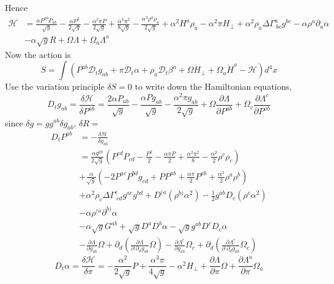 \documentclass{article}
\begin{document}
Hence
\begin{align*}
\mathscr{H} & = \frac{\alpha P^{ab}P_{ab}}{\sqrt{g}} - \frac{\alpha P^{2}}{2\sqrt{g}} - \frac{\alpha^{2}\pi P}{2\sqrt{g}} + \frac{\alpha^{3}\pi^{2}}{8\sqrt{g}} - \frac{\alpha^{3}\rho^{a}\rho_{a}}{2\sqrt{g}} + \alpha^{2}H^{a}\rho_{a} - \alpha^{2}\pi H_{\perp} + \alpha^{2}\rho_{a}\Delta \Gamma^{a}_{~bc}g^{bc} - \alpha \rho^{a}\partial_{a}\alpha\\
&  - \alpha \sqrt{g}R + \Omega\Lambda + \Omega_{a}\Lambda^{a}
\end{align*}
Now the action is
\[
S = \int \left( P^{ab}\mathscr{D}_{t}g_{ab} + \pi \mathscr{D}_{t}\alpha + \rho_{a}\mathscr{D}_{t}\beta^{a} + \Omega{\dot H}_{\perp} + \Omega_{a}{\dot H}^{a} - \mathscr{H}\right) d^{4} x
\]
Use the variation principle $\delta S = 0$ to write down the Hamiltonian equations,
\[
D_{t}g_{ab} = \frac{\delta \mathscr{H}}{\delta P^{ab}} = \frac{2\alpha P_{ab}}{\sqrt{g}} - \frac{\alpha P g_{ab}}{\sqrt{g}} - \frac{\alpha^{2} \pi g_{ab}}{2 \sqrt{g}} + \Omega\frac{\partial \Lambda}{\partial P^{ab}} + \Omega_{c}\frac{\partial \Lambda^{c}}{\partial P^{ab}}
\]
since $\delta g = g g^{ab}\delta g_{ab}$, $\delta R = $
\begin{align*}
D_{t} P^{ab} & = - \frac{\delta \mathscr{H}}{\delta g_{ab}}\\
&  = \frac{\alpha g^{ab}}{2\sqrt{g}}\left(P^{cd}P_{cd} - \frac{P^{2}}{2} - \frac{\alpha \pi P}{2} + \frac{\alpha^{2}\pi^{2}}{8} - \frac{\alpha^{2}}{2}\rho^{c}\rho_{c}\right)\\
& + \frac{\alpha}{\sqrt{g}}\left(-2P^{ac}P^{bd}g_{cd} + PP^{ab} + \frac{\alpha \pi}{2}P^{ab} + \frac{\alpha^{2}}{2}\rho^{a}\rho^{b}\right)\\
& + \alpha^{2}\rho_{e}\Delta \Gamma^{e}_{~cd}g^{ac}g^{bd} + D^{(a}\left(\rho^{b)}\alpha^{2}\right) - \frac{1}{2}g^{ab}D_{c}\left(\rho^{c}\alpha^{2}\right)\\
& - \alpha \rho^{(a}\partial^{b)}\alpha\\
& - \alpha \sqrt{g}G^{ab} + \sqrt{g}D^{a}D^{b}\alpha - \sqrt{g}g^{ab}D^{c}D_{c}\alpha\\
& - \frac{\partial \Lambda}{\partial g_{ab}}\Omega + \partial_{d}\left(\frac{\partial \Lambda}{\partial~\partial_{d}g_{ab}}\Omega\right) - \frac{\partial \Lambda^{c}}{\partial g_{ab}}\Omega_{c} + \partial_{d}\left(\frac{\partial \Lambda^{c}}{\partial~\partial_{d}g_{ab}}\Omega_{c}\right)
\end{align*}
\[
D_{t}\alpha = \frac{\delta \mathscr{H}}{\delta \pi} = - \frac{\alpha^{2}}{2\sqrt{g}}P + \frac{\alpha^{3}\pi}{4\sqrt{g}} - \alpha^{2}H_{\perp} + \frac{\partial \Lambda}{\partial \pi}\Omega + \frac{\partial \Lambda^{a}}{\partial \pi}\Omega_{a}
\]
\end{document}

